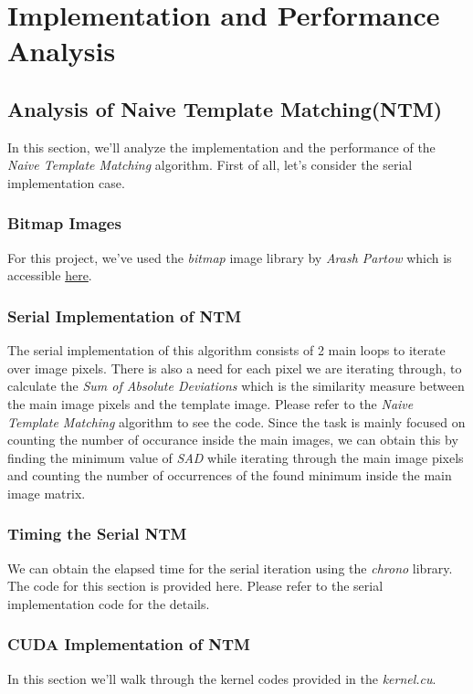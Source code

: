 \chapter{Implementation and Performance Analysis}

\section{Analysis of Naive Template Matching(NTM)}
In this section, we'll analyze the implementation and the performance of the \textit{Naive Template Matching} algorithm. First of all, let's consider the serial implementation case. 

\subsection{Bitmap Images}
For this project, we've used the \textit{bitmap} image library by \textit{Arash Partow} which is accessible \href{https://github.com/ArashPartow/bitmap}{here}.

\subsection{Serial Implementation of NTM}
The serial implementation of this algorithm consists of 2 main loops to iterate over image pixels. There is also a need for each pixel we are iterating through, to calculate the \textit{Sum of Absolute Deviations} which is the similarity measure between the main image pixels and the template image. Please refer to the \textit{Naive Template Matching} algorithm to see the code. Since the task is mainly focused on counting the number of occurance inside the main images, we can obtain this by finding the minimum value of \textit{SAD} while iterating through the main image pixels and counting the number of occurrences of the found minimum inside the main image matrix.

\subsection{Timing the Serial NTM}
We can obtain the elapsed time for the serial iteration using the \textit{chrono} library. The code for this section is provided here. Please refer to the serial implementation code for the details. 

\subsection{CUDA Implementation of NTM}
In this section we'll walk through the kernel codes provided in the \textit{kernel.cu}.

